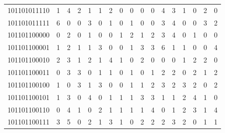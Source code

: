 \documentclass[10pt,a4paper]{article}
\begin{document}
\begin{longtable}{ |c|c|c|c|c|c|c|c|c|c|c|c|c|c|c|c|c| }
    101101011110              & 1                            & 4                                & 2                            & 1                              & 1   & 2   & 0   & 0   & 0   & 0   & 4   & 3   & 1   & 0   & 2   & 0   \\
    101101011111              & 6                            & 0                                & 0                            & 3                              & 0   & 1   & 0   & 1   & 0   & 0   & 3   & 4   & 0   & 0   & 3   & 2   \\
    101101100000              & 0                            & 2                                & 0                            & 1                              & 0   & 0   & 1   & 2   & 1   & 2   & 3   & 4   & 0   & 1   & 0   & 0   \\
    101101100001              & 1                            & 2                                & 1                            & 1                              & 3   & 0   & 0   & 1   & 3   & 3   & 6   & 1   & 1   & 0   & 0   & 4   \\
    101101100010              & 2                            & 3                                & 1                            & 2                              & 1   & 4   & 1   & 0   & 2   & 0   & 0   & 0   & 1   & 2   & 2   & 0   \\
    101101100011              & 0                            & 3                                & 3                            & 0                              & 1   & 1   & 0   & 1   & 0   & 1   & 2   & 2   & 0   & 2   & 1   & 2   \\
    101101100100              & 1                            & 0                                & 3                            & 1                              & 3   & 0   & 0   & 1   & 1   & 2   & 3   & 2   & 3   & 2   & 0   & 2   \\
    101101100101              & 1                            & 3                                & 0                            & 4                              & 0   & 1   & 1   & 1   & 3   & 3   & 1   & 1   & 2   & 4   & 1   & 0   \\
    101101100110              & 0                            & 4                                & 1                            & 0                              & 2   & 1   & 1   & 1   & 1   & 4   & 0   & 1   & 2   & 3   & 1   & 4   \\
    101101100111              & 3                            & 5                                & 0                            & 2                              & 1   & 3   & 1   & 0   & 2   & 2   & 2   & 3   & 2   & 0   & 1   & 1   \\

\end{longtable}
\end{document}
